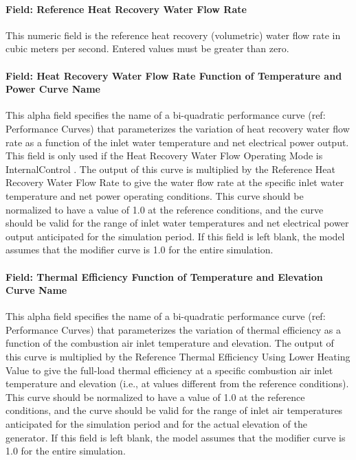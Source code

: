 \paragraph{Field: Reference Heat Recovery Water Flow Rate}\label{field-reference-heat-recovery-water-flow-rate}

This numeric field is the reference heat recovery (volumetric) water flow rate in cubic meters per second. Entered values must be greater than zero.

\paragraph{Field: Heat Recovery Water Flow Rate Function of Temperature and Power Curve Name}\label{field-heat-recovery-water-flow-rate-function-of-temperature-and-power-curve-name}

This alpha field specifies the name of a bi-quadratic performance curve (ref: Performance Curves) that parameterizes the variation of heat recovery water flow rate as a function of the inlet water temperature and net electrical power output. This field is only used if the Heat Recovery Water Flow Operating Mode is InternalControl . The output of this curve is multiplied by the Reference Heat Recovery Water Flow Rate to give the water flow rate at the specific inlet water temperature and net power operating conditions. This curve should be normalized to have a value of 1.0 at the reference conditions, and the curve should be valid for the range of inlet water temperatures and net electrical power output anticipated for the simulation period. If this field is left blank, the model assumes that the modifier curve is 1.0 for the entire simulation.

\paragraph{Field: Thermal Efficiency Function of Temperature and Elevation Curve Name}\label{field-thermal-efficiency-function-of-temperature-and-elevation-curve-name}

This alpha field specifies the name of a bi-quadratic performance curve (ref: Performance Curves) that parameterizes the variation of thermal efficiency as a function of the combustion air inlet temperature and elevation. The output of this curve is multiplied by the Reference Thermal Efficiency Using Lower Heating Value to give the full-load thermal efficiency at a specific combustion air inlet temperature and elevation (i.e., at values different from the reference conditions). This curve should be normalized to have a value of 1.0 at the reference conditions, and the curve should be valid for the range of inlet air temperatures anticipated for the simulation period and for the actual elevation of the generator. If this field is left blank, the model assumes that the modifier curve is 1.0 for the entire simulation.

